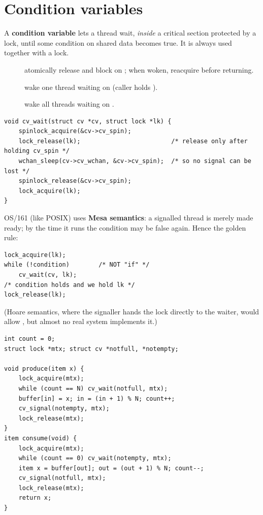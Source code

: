 \section{Condition variables}

A \textbf{condition variable} lets a thread wait, \emph{inside} a critical section protected by a
lock, until some condition on shared data becomes true. It is always used together with a lock.

\begin{description}
  \item[] atomically release  and block on ; when woken,
    reacquire  before returning.
  \item[] wake one thread waiting on  (caller holds ).
  \item[] wake all threads waiting on .
\end{description}

\begin{lstlisting}[style=c]
void cv_wait(struct cv *cv, struct lock *lk) {
    spinlock_acquire(&cv->cv_spin);
    lock_release(lk);                         /* release only after holding cv_spin */
    wchan_sleep(cv->cv_wchan, &cv->cv_spin);  /* so no signal can be lost */
    spinlock_release(&cv->cv_spin);
    lock_acquire(lk);
}
\end{lstlisting}

OS/161 (like POSIX) uses \textbf{Mesa semantics}: a signalled thread is merely made ready; by the
time it runs the condition may be false again. Hence the golden rule:

\begin{important}
\begin{lstlisting}[style=c]
lock_acquire(lk);
while (!condition)        /* NOT "if" */
    cv_wait(cv, lk);
/* condition holds and we hold lk */
lock_release(lk);
\end{lstlisting}
(Hoare semantics, where the signaller hands the lock directly to the waiter, would allow
, but almost no real system implements it.)
\end{important}

\begin{example}
\begin{lstlisting}[style=c]
int count = 0;
struct lock *mtx; struct cv *notfull, *notempty;

void produce(item x) {
    lock_acquire(mtx);
    while (count == N) cv_wait(notfull, mtx);
    buffer[in] = x; in = (in + 1) % N; count++;
    cv_signal(notempty, mtx);
    lock_release(mtx);
}
item consume(void) {
    lock_acquire(mtx);
    while (count == 0) cv_wait(notempty, mtx);
    item x = buffer[out]; out = (out + 1) % N; count--;
    cv_signal(notfull, mtx);
    lock_release(mtx);
    return x;
}
\end{lstlisting}
\end{example}

